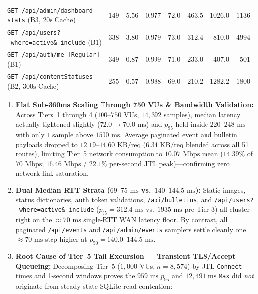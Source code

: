 \documentclass[11pt,letterpaper]{article}
\begin{document}
\begin{table}[H]
\begin{tabularx}{\textwidth}{@{} >{\raggedright\arraybackslash}X r r r r r r r @{}}
\texttt{GET /api/admin/dashboard-stats} (B3, $20\text{s}$ Cache) & $149$ & $5.56$ & $0.977$ & $72.0$ & $463.5$ & $1026.0$ & $1136$ \\
\texttt{GET /api/users?\_\allowbreak where=active\&\_\allowbreak include} (B1) & $338$ & $3.80$ & $0.979$ & $73.0$ & $312.4$ & $810.0$ & $4994$ \\
\texttt{GET /api/auth/me [Regular]} (B1) & $349$ & $0.87$ & $0.999$ & $71.0$ & $233.0$ & $407.0$ & $501$ \\
\texttt{GET /api/contentStatuses} (B2, $300\text{s}$ Cache) & $255$ & $0.57$ & $0.988$ & $69.0$ & $210.2$ & $1282.2$ & $1800$ \\
\bottomrule
\end{tabularx}
\end{table}

\begin{enumerate}
  \item \textbf{Flat Sub-360ms Scaling Through 750 VUs \& Bandwidth Validation:} Across Tiers~1 through 4 ($100\text{--}750$ VUs, $14{,}392$ samples), median latency actually tightened slightly ($72.0\to 70.0\text{ ms}$) and $p_{95}$ held inside $220\text{--}248\text{ ms}$ with only $1$ sample above $1500\text{ ms}$. Average paginated event and bulletin payloads dropped to $12.19\text{--}14.60\text{ KB/req}$ ($6.34\text{ KB/req}$ blended across all 51 routes), limiting Tier~5 network consumption to $10.07\text{ Mbps}$ mean ($14.39\%$ of $70\text{ Mbps}$; $15.46\text{ Mbps}$ / $22.1\%$ per-second JTL peak)—confirming zero network-link saturation.
  \item \textbf{Dual Median RTT Strata ($69\text{--}75\text{ ms}$ vs.\ $140\text{--}144.5\text{ ms}$):} Static images, status dictionaries, auth token validations, \texttt{/api/bulletins}, and \texttt{/api/users?\_where=active\&\_include} ($p_{95} = 312.4\text{ ms}$ vs.\ $1935\text{ ms}$ pre-Tier-3) all cluster right on the $\approx 70\text{ ms}$ single-RTT WAN latency floor. By contrast, all paginated \texttt{/api/events} and \texttt{/api/admin/events} samplers settle cleanly one $\approx 70\text{ ms}$ step higher at $p_{50} = 140.0\text{--}144.5\text{ ms}$.
  \item \textbf{Root Cause of Tier~5 Tail Excursion — Transient TLS/Accept Queueing:} Decomposing Tier~5 ($1{,}000$ VUs, $n = 8{,}574$) by JTL \texttt{Connect} times and 1-second windows proves the $959\text{ ms}$ $p_{95}$ and $12{,}491\text{ ms}$ \texttt{Max} did \emph{not} originate from steady-state SQLite read contention:
  \begin{itemize}

\end{itemize}
\end{enumerate}
\end{document}
